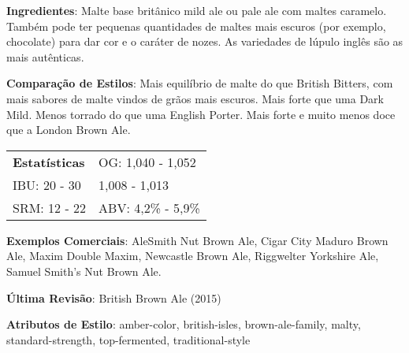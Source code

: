 \textbf{Ingredientes}: Malte base britânico mild ale ou pale ale com maltes caramelo. Também pode ter pequenas quantidades de maltes mais escuros (por exemplo, chocolate) para dar cor e o caráter de nozes. As variedades de lúpulo inglês são as mais autênticas.

\textbf{Comparação de Estilos}: Mais equilíbrio de malte do que British Bitters, com mais sabores de malte vindos de grãos mais escuros. Mais forte que uma Dark Mild. Menos torrado do que uma English Porter. Mais forte e muito menos doce que a London Brown Ale.

\begin{tabular}{@{}p{35mm}p{35mm}@{}}
  \textbf{Estatísticas} & OG: 1,040 - 1,052 \\
  IBU: 20 - 30  & 1,008 - 1,013  \\
  SRM: 12 - 22  & ABV: 4,2\% - 5,9\%
\end{tabular}

\textbf{Exemplos Comerciais}: AleSmith Nut Brown Ale, Cigar City Maduro Brown Ale, Maxim Double Maxim, Newcastle Brown Ale, Riggwelter Yorkshire Ale, Samuel Smith’s Nut Brown Ale.

\textbf{Última Revisão}: British Brown Ale (2015)

\textbf{Atributos de Estilo}: amber-color, british-isles, brown-ale-family, malty, standard-strength, top-fermented, traditional-style
